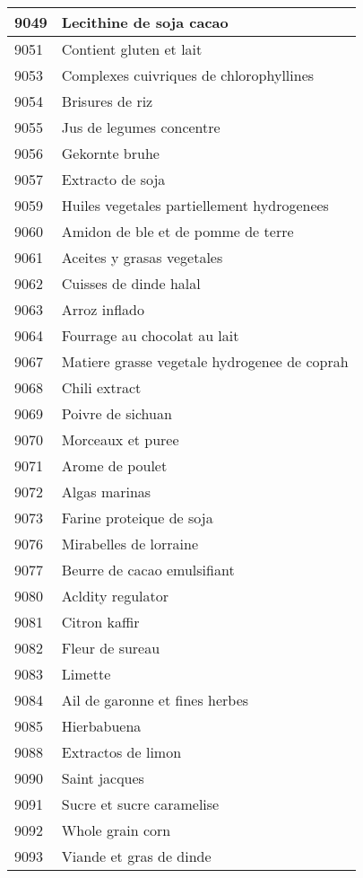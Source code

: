 \begin{longtable}{|l|l|}
9049 & Lecithine de soja cacao \\ \hline 
9051 & Contient gluten et lait \\ \hline 
9053 & Complexes cuivriques de chlorophyllines \\ \hline 
9054 & Brisures de riz \\ \hline 
9055 & Jus de legumes concentre \\ \hline 
9056 & Gekornte bruhe \\ \hline 
9057 & Extracto de soja \\ \hline 
9059 & Huiles vegetales partiellement hydrogenees \\ \hline 
9060 & Amidon de ble et de pomme de terre \\ \hline 
9061 & Aceites y grasas vegetales \\ \hline 
9062 & Cuisses de dinde halal \\ \hline 
9063 & Arroz inflado \\ \hline 
9064 & Fourrage au chocolat au lait \\ \hline 
9067 & Matiere grasse vegetale hydrogenee de coprah \\ \hline 
9068 & Chili extract \\ \hline 
9069 & Poivre de sichuan \\ \hline 
9070 & Morceaux et puree \\ \hline 
9071 & Arome de poulet \\ \hline 
9072 & Algas marinas \\ \hline 
9073 & Farine proteique de soja \\ \hline 
9076 & Mirabelles de lorraine \\ \hline 
9077 & Beurre de cacao emulsifiant \\ \hline 
9080 & Acldity regulator \\ \hline 
9081 & Citron kaffir \\ \hline 
9082 & Fleur de sureau \\ \hline 
9083 & Limette \\ \hline 
9084 & Ail de garonne et fines herbes \\ \hline 
9085 & Hierbabuena \\ \hline 
9088 & Extractos de limon \\ \hline 
9090 & Saint jacques \\ \hline 
9091 & Sucre et sucre caramelise \\ \hline 
9092 & Whole grain corn \\ \hline 
9093 & Viande et gras de dinde \\ \hline 

\end{longtable}
